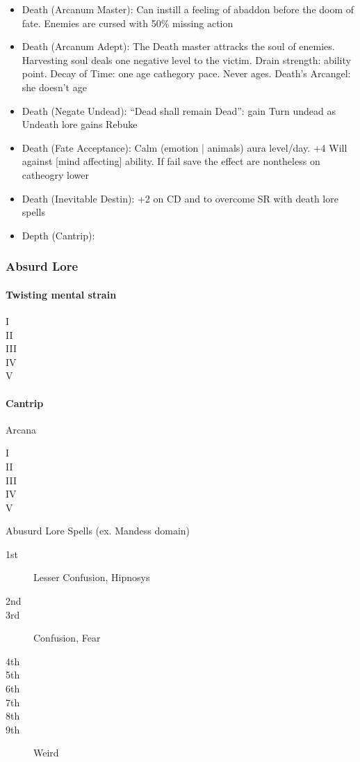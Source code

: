\documentclass[10pt,a4paper]{article}
\begin{document}
\begin{description}
\begin{itemize}
	\item Death (Arcanum Master): Can instill a feeling of abaddon before the doom of fate. Enemies are cursed with 50\% missing action
	\item Death (Arcanum Adept): The Death master attracks the soul of enemies. Harvesting soul deals one negative level to the victim. Drain strength: ability point. Decay of Time: one age cathegory pace. Never ages. Death's Arcangel: she doesn't age
	\item Death (Negate Undead): ``Dead shall remain Dead'': gain Turn undead as Undeath lore gains Rebuke
	\item Death (Fate Acceptance): Calm (emotion | animals) aura level/day. +4 Will against [mind affecting] ability. If fail save the effect are nontheless on catheogry lower
	\item Death (Inevitable Destin): +2 on CD and to overcome SR with death lore spells
	\item Depth (Cantrip):  
	\end{itemize}
\end{description}


\subsubsection{Absurd Lore}
\paragraph{Twisting mental strain} 
\begin{description}
\item[I] 
\item[II] 
\item[III] 
\item[IV] 
\item[V] 
\end{description}
\paragraph{Cantrip}
Arcana \begin{description}
\item[I] 
\item[II] 
\item[III] 
\item[IV] 
\item[V] 
\end{description}
Abusurd Lore Spells (ex. Mandess domain)
\begin{description}
\item[1st] Lesser Confusion, Hipnosys
\item[2nd]  
\item[3rd] Confusion, Fear
\item[4th]  
\item[5th]
\item[6th] 
\item[7th] 
\item[8th]  
\item[9th] Weird
\end{description}
\end{document}
